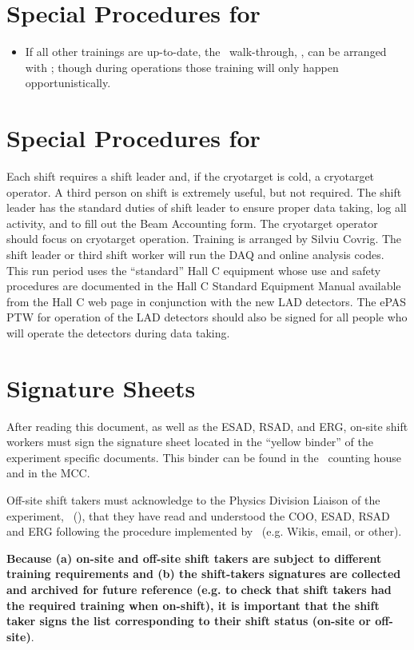 %
\newpage
\section{Special Procedures for \HALL}

\begin{itemize}

\item{
If all other trainings are up-to-date, the \HALL\ walk-through, \AWARENESS, can be arranged 
with {\WALKTHROUGHTRAINER}; 
though during operations those training will only 
happen opportunistically.   
}
\end{itemize}

%
\newpage
\section{Special Procedures for \EXPTS}

Each shift requires a shift leader and, if the cryotarget is cold, a cryotarget 
operator.  A third person on shift is extremely useful, but not required. The shift leader 
has the standard
duties of shift leader to ensure proper data taking, log all activity, and to fill out
the Beam Accounting form. The cryotarget operator should focus on cryotarget
operation. Training is arranged by Silviu Covrig. The shift leader or third
shift worker will run the DAQ and online analysis codes.
This run period uses the ``standard'' Hall C equipment whose
use and safety procedures are documented in the Hall C Standard Equipment
Manual available from the Hall C web page in conjunction with the new LAD detectors. The ePAS PTW for operation of the LAD detectors should also be signed for all people who will operate the detectors during data taking.


\newpage
\section{Signature Sheets}

After reading this document, as well as the ESAD, RSAD, and ERG, on-site shift workers must sign
the signature sheet located in the ``yellow binder'' of the experiment specific documents.
This binder can be found in the \HALL\ counting house and in the MCC.

Off-site shift takers must acknowledge to the Physics Division Liaison of the experiment, \PHYSDIVLIAISON\ (\PHYSDIVLIAISONEMAIL),
that they have read and understood the COO, ESAD, RSAD and ERG following the procedure implemented by \HALL\ (e.g. Wikis, email, or other).

{\bf Because (a) on-site and off-site shift takers are subject to different training requirements and (b) the shift-takers signatures are collected and archived for future reference (e.g. to check that shift takers had the required training when on-shift), it is important that the shift taker signs the list corresponding to their shift status (on-site or off-site)}.
